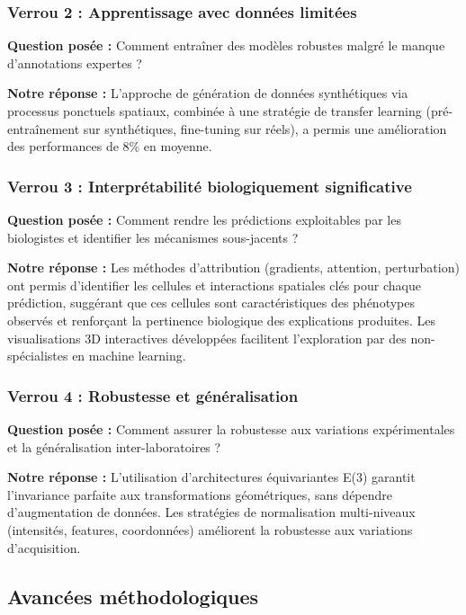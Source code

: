 \subsubsection{Verrou 2 : Apprentissage avec données limitées}

\textbf{Question posée :} Comment entraîner des modèles robustes malgré le manque d'annotations expertes ?

\textbf{Notre réponse :}
L'approche de génération de données synthétiques via processus ponctuels spatiaux, combinée à une stratégie de transfer learning (pré-entraînement sur synthétiques, fine-tuning sur réels), a permis une amélioration des performances de 8\% en moyenne.

\subsubsection{Verrou 3 : Interprétabilité biologiquement significative}

\textbf{Question posée :} Comment rendre les prédictions exploitables par les biologistes et identifier les mécanismes sous-jacents ?

\textbf{Notre réponse :}
Les méthodes d'attribution (gradients, attention, perturbation) ont permis d'identifier les cellules et interactions spatiales clés pour chaque prédiction, suggérant que ces cellules sont caractéristiques des phénotypes observés et renforçant la pertinence biologique des explications produites. Les visualisations 3D interactives développées facilitent l'exploration par des non-spécialistes en machine learning.

\subsubsection{Verrou 4 : Robustesse et généralisation}

\textbf{Question posée :} Comment assurer la robustesse aux variations expérimentales et la généralisation inter-laboratoires ?

\textbf{Notre réponse :}
L'utilisation d'architectures équivariantes E(3) garantit l'invariance parfaite aux transformations géométriques, sans dépendre d'augmentation de données. Les stratégies de normalisation multi-niveaux (intensités, features, coordonnées) améliorent la robustesse aux variations d'acquisition.
\subsection{Avancées méthodologiques}

